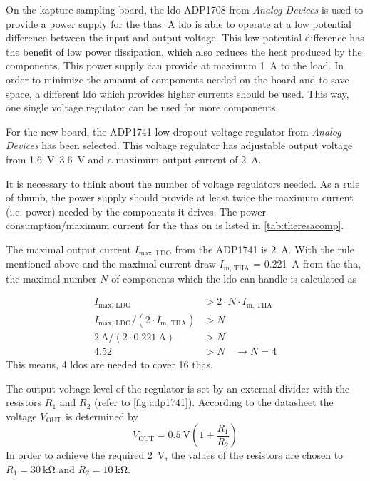 On the \gls{kapture} sampling board, the \gls{ldo} ADP1708 from \textit{Analog Devices} is used to provide a power supply for the \glspl{tha}. 
A \gls{ldo} is able to operate at a low potential difference between the input and output voltage. 
This low potential difference has the benefit of low power dissipation, which also reduces the heat produced by the components.  
This power supply can provide at maximum \SI{1}{\ampere} to the load. 
In order to minimize the amount of components needed on the board and to save space, a different \gls{ldo} which provides higher currents should be used. 
This way, one single voltage regulator can be used for more components.

For the new board, the ADP1741 low-dropout voltage regulator from \textit{Analog Devices} has been selected. This voltage regulator has adjustable output voltage from \SIrange{1.6}{3.6}{\volt} and a maximum output current of \SI{2}{\ampere}. 

It is necessary to think about the number of voltage regulators needed. As a rule of thumb, the power supply should provide at least twice the maximum current (i.e. power) needed by the components it drives. \cite{michele} The power consumption/maximum current for the \glspl{tha} on is listed in \autoref{tab:theresacomp}. 

The maximal output current $I_\text{max, LDO}$ from the ADP1741 is \SI{2}{\ampere}.
With the rule mentioned above and the maximal current draw $I_\text{m, THA}$ = \SI{0.221}{\ampere} from the \gls{tha}, the maximal number $N$ of components which the \gls{ldo} can handle is calculated as 

\begin{align*}
	I_\text{max, LDO} &> 2 \cdot N \cdot I_\text{m, THA} \\
	I_\text{max, LDO}/(2 \cdot I_\text{m, THA}) &> N \\
	\SI{2}{\ampere} / (2\cdot \SI{0.221}{\ampere}) &> N \\
	4.52 &> N \quad \rightarrow N = 4
\end{align*}
This means, 4 \glspl{ldo} are needed to cover 16 \glspl{tha}.

The output voltage level of the regulator is set by an external divider with the resistors $R_1$ and $R_2$ (refer to \autoref{fig:adp1741}). According to the datasheet \cite{adp1741} the voltage $V_\text{OUT}$ is determined by
\begin{equation}\label{eq:ldo}
	V_\text{OUT} = \SI{0.5}{\volt}\left(1 + \frac{R_1}{R_2} \right)
\end{equation}
In order to achieve the required \SI{2}{\volt}, the values of the resistors are chosen to $R_1 = \SI{30}{\kilo\ohm}$ and $R_2 = \SI{10}{\kilo \ohm}$. 

